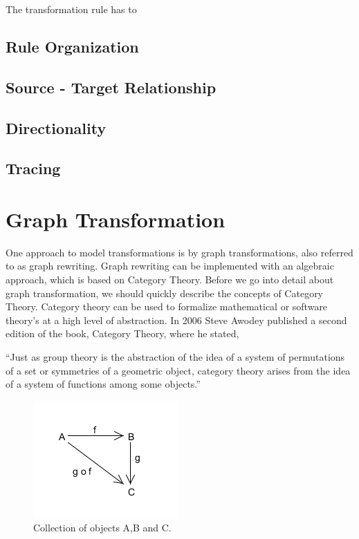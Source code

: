 The transformation rule has to 

\subsection{Rule Organization}

\subsection{Source - Target Relationship}

\subsection{Directionality}

\subsection{Tracing}



\section{Graph Transformation} 

One approach to model transformations is by graph transformations,
also referred to as graph rewriting. Graph rewriting can be implemented with
an algebraic approach, which is based on Category Theory. Before we go into
detail about graph transformation, we should quickly describe the concepts of
Category Theory\cite{Herrlich1973,Barr1990}. Category theory can be used to
formalize mathematical or software theory's at a high level of abstraction. In
2006 Steve Awodey published a second edition of the book, Category Theory,
where he stated,

``Just as group theory is the abstraction of the idea of a system of
permutations of a set or symmetries of a geometric object, category theory
arises from the idea of a system of functions among some
objects\cite{Awodey2006}.''

\begin{figure}[H]
	\centering
	\includegraphics[scale=0.7]{./Figures/categoryTheory.png}
	\caption[Category Theory]
	{Collection of objects A,B and C.}
	\label{fig:categoryTheory}
\end{figure}

